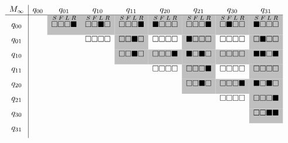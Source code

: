 \hspace{-0.18cm}\ensuremath{
  \begin{array}{c|cccccccc}
    M_\infty & q_{00} & q_{01} & q_{10} & q_{11} & q_{20} & q_{21} & q_{30} & q_{31} \\ \hline
    q_{00}       &        &
    \cellcolor{lightgray}{\overset{S}{\ws}\overset{F}{\ws}\overset{L}{\ws}\overset{R}{\bs}} &
    \cellcolor{lightgray}{\overset{S}{\ws}\overset{F}{\ws}\overset{L}{\bs}\overset{R}{\ws}} &
    \cellcolor{lightgray}{\overset{S}{\ws}\overset{F}{\ws}\overset{L}{\ws}\overset{R}{\bs}} &
    \cellcolor{lightgray}{\overset{S}{\bs}\overset{F}{\ws}\overset{L}{\ws}\overset{R}{\ws}} &
    \cellcolor{lightgray}{\overset{S}{\ws}\overset{F}{\ws}\overset{L}{\ws}\overset{R}{\bs}} &
    \cellcolor{lightgray}{\overset{S}{\ws}\overset{F}{\bs}\overset{L}{\ws}\overset{R}{\ws}} &
    \cellcolor{lightgray}{\overset{S}{\bs}\overset{F}{\ws}\overset{L}{\ws}\overset{R}{\ws}} \\ [6pt]
    q_{01}       &        &              & \ws\ws\ws\ws & \cellcolor{lightgray}{\ws\ws\bs\ws} & \ws\ws\ws\ws & \cellcolor{lightgray}{\bs\ws\ws\ws} & \ws\ws\ws\ws & \cellcolor{lightgray}{\ws\bs\ws\ws} \\ [6pt]
    q_{10}       &        &              &              & \cellcolor{lightgray}{\ws\ws\bs\ws} & \cellcolor{lightgray}{\ws\ws\ws\bs} & \cellcolor{lightgray}{\bs\ws\bs\ws} & \cellcolor{lightgray}{\ws\ws\ws\ws} & \cellcolor{lightgray}{\bs\bs\ws\bs} \\ [6pt]
    q_{11}       &        &              &              &              & \ws\ws\ws\ws & \cellcolor{lightgray}{\ws\ws\ws\bs} & \ws\ws\ws\ws & \cellcolor{lightgray}{\ws\ws\ws\ws} \\ [6pt]
    q_{20}       &        &              &              &              &              & \cellcolor{lightgray}{\ws\ws\bs\ws} & \cellcolor{lightgray}{\ws\ws\ws\bs} & \cellcolor{lightgray}{\bs\ws\bs\ws} \\ [6pt]
    q_{21}       &        &              &              &              &              &              & \ws\ws\ws\ws & \cellcolor{lightgray}{\ws\ws\ws\bs} \\ [6pt]
    q_{30}       &        &              &              &              &              &              &              & \cellcolor{lightgray}{\ws\ws\bs\bs} \\ [6pt]
    q_{31}       &        &              &              &              &              &              &              &              \\ [6pt]
  \end{array}
}
